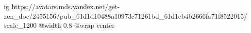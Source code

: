  
 
 
 
 

\ifcmt
  ig https://avatars.mds.yandex.net/get-zen_doc/2455156/pub_61d1d10488a10973c71261bd_61d1eb4b2666fa71f8522015/scale_1200
	@width 0.8
	@wrap center
\fi
